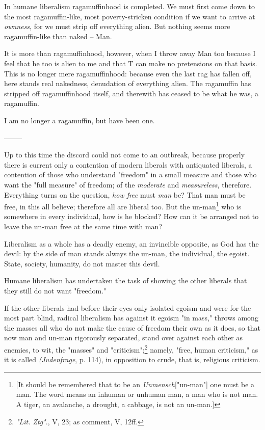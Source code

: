In humane liberalism ragamuffinhood is completed. We must first come down to 
the most ragamuffin-like, most poverty-stricken condition if we want to arrive 
at \textit{ownness}, for we must strip off everything alien. But nothing seems 
more ragamuffin-like than naked -- Man.

It is more than ragamuffinhood, however, when I throw away Man too because I 
feel that he too is alien to me and that T can make no pretensions on that 
basis. This is no longer mere ragamuffinhood: because even the last rag has 
fallen off, here stands real nakedness, denudation of everything alien. The 
ragamuffin has stripped off ragamuffinhood itself, and therewith has ceased to 
be what he was, a ragamuffin.

I am no longer a ragamuffin, but have been one.

\begin{center}
--------\end{center}


Up to this time the discord could not come to an outbreak, because properly 
there is current only a contention of modern liberals with antiquated 
liberals, a contention of those who understand "{}freedom"{} in a small 
measure and those who want the "{}full measure"{} of freedom; of the 
\textit{moderate} and \textit{measureless}, therefore. Everything turns on the 
question, \textit{how free} must \textit{man} be? That man must be free, in 
this all believe; therefore all are liberal too. But the un-man\footnote{[It 
should be remembered that to be an \textit{Unmensch}["{}un-man"{}] one must be 
a man. The word means an inhuman or unhuman man, a man who is not man. A 
tiger, an avalanche, a drought, a cabbage, is not an un-man.]} who is 
somewhere in every individual, how is he blocked? How can it be arranged not 
to leave the un-man free at the same time with man?

Liberalism as a whole has a deadly enemy, an invincible opposite, as God has 
the devil: by the side of man stands always the un-man, the individual, the 
egoist. State, society, humanity, do not master this devil.

Humane liberalism has undertaken the task of showing the other liberals that 
they still do not want "{}freedom."{}

If the other liberals had before their eyes only isolated egoism and were for 
the most part blind, radical liberalism has against it egoism "{}in mass,"{} 
throws among the masses all who do not make the cause of freedom their own as 
it does, so that now man and un-man rigorously separated, stand over against 
each other as enemies, to wit, the "{}masses"{} and 
"{}criticism"{};\footnote{\textit{"{}Lit. Ztg"{}}., V, 23; as comment, V, 12ff.} 
namely, "{}free, human criticism,"{} as it is called \textit{(Judenfrage}, p. 
114), in opposition to crude, that is, religious criticism.

